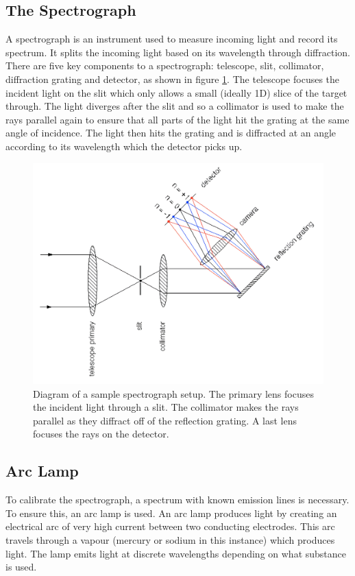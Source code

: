\documentclass[a4paper,12pt,twocolumn]{article}
\let\cite=\supercite
\begin{document}
		\subsection{The Spectrograph}	
			A spectrograph is an instrument used to measure incoming light and record its spectrum\cite{atnf}. It splits the incoming light based on its wavelength through diffraction. There are five key components to a spectrograph: telescope, slit, collimator, diffraction grating and detector, as shown in figure \ref{fig:spectrograph}. The telescope focuses the incident light on the slit which only allows a small (ideally 1D) slice of the target through\cite{manual}. The light diverges after the slit and so a collimator is used to make the rays parallel again to ensure that all parts of the light hit the grating at the same angle of incidence. The light then hits the grating and is diffracted at an angle according to its wavelength which the detector picks up.
		
			\begin{figure}
				\includegraphics[width=\columnwidth]{spectrograph_refl-transformed.png}
				\captionsetup{font=scriptsize}
				\caption{Diagram of a sample spectrograph setup\cite{vik}. The primary lens focuses the incident light through a slit. The collimator makes the rays parallel as they diffract off of the reflection grating. A last lens focuses the rays on the detector.}
				\label{fig:spectrograph}
			\end{figure}
		
		\subsection{Arc Lamp}
			To calibrate the spectrograph, a spectrum with known emission lines is necessary. To ensure this, an arc lamp is used. An arc lamp produces light by creating an electrical arc of very high current between two conducting electrodes\cite{maglab}. This arc travels through a vapour (mercury or sodium in this instance) which produces light. The lamp emits light at discrete wavelengths depending on what substance is used.
			
\end{document}
